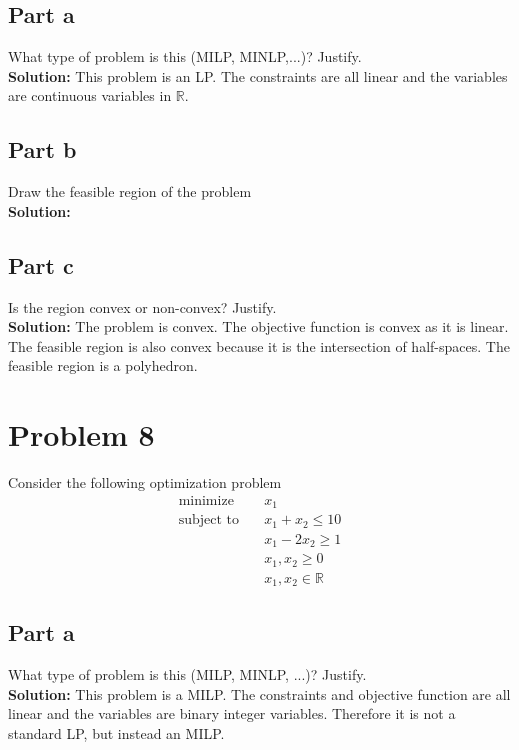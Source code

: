 \documentclass[11pt]{article}
\begin{document}
\subsection{Part a}
What type of problem is this (MILP, MINLP,...)? Justify.
\\
\textbf{Solution: }
This problem is an LP. The constraints are all linear and the variables are continuous variables in $\mathbb{R}$.

\subsection{Part b}
Draw the feasible region of the problem
\\
\textbf{Solution: }


\subsection{Part c}
Is the region convex or non-convex? Justify.
\\
\textbf{Solution: }
The problem is convex. 
The objective function is convex as it is linear. 
The feasible region is also convex because it is the intersection of half-spaces.
The feasible region is a polyhedron.

\section{Problem 8}Consider the following optimization problem
\begin{align}
  \text{minimize} & \quad x_1 \\
  \text{subject to} & \quad x_1 + x_2 \leq 10 \\
  & \quad x_1 - 2x_2 \geq 1 \\
  & \quad x_1, x_2 \geq 0 \\
  & \quad x_1, x_2 \in \mathbb{R}
\end{align}

\subsection{Part a}
What type of problem is this (MILP, MINLP, ...)? Justify.
\\
\textbf{Solution: }
This problem is a MILP. 
The constraints and objective function are all linear and the variables are binary integer variables.
Therefore it is not a standard LP, but instead an MILP.
\end{document}
